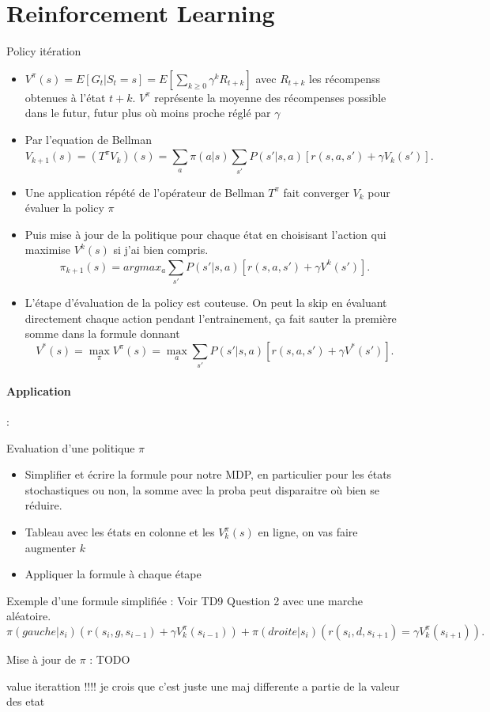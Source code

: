 \documentclass{article}
\theoremstyle{plain}%
\theoremstyle{definition}
\theoremstyle{remark}
\begin{document}
\section{Reinforcement Learning}
Policy itération \begin{itemize}
    \item $ V^\pi (s) = E[G_t | S_t = s] = E[ \sum_{k \geq 0}^{} \gamma ^k R_{t+k}] $ avec $ R_{t+k} $ les récompenss obtenues à l'état $ t+k $. $ V^\pi $ représente la moyenne des récompenses possible dans le futur, futur plus où moins proche réglé par $ \gamma  $ 
    \item Par l'equation de Bellman
    \[
        V_{k+1}(s) = (T^\pi V_k)(s) = \sum_{a}^{}\pi (a | s) \sum_{s'}^{}P(s' | s, a) [r(s, a, s') + \gamma V_k(s')]
    .\]
    \item Une application répété de l'opérateur de Bellman $ T^\pi  $ fait converger $ V_k $ pour évaluer la policy $ \pi  $ 
    \item Puis mise à jour de la politique pour chaque état en choisisant l'action qui maximise $ V^k(s) $ si j'ai bien compris. 
    \[
        \pi _{k+1}(s) = argmax_a \sum_{s'}^{} P(s' | s, a) [ r(s, a, s') + \gamma V^{k}(s')]
    .\]
    \item L'étape d'évaluation de la policy est couteuse. On peut la skip en évaluant directement chaque action pendant l'entrainement, ça fait sauter la première somme dans la formule donnant 
    \[
        V^*(s) = \max _\pi V^\pi (s) = \max _a \sum_{s'}^{} P(s' | s, a)[r(s, a, s') + \gamma V^*(s')]
    .\]
\end{itemize}


\paragraph*{Application} : 

Evaluation d'une politique $ \pi  $ 
\begin{itemize}
    \item Simplifier et écrire la formule pour notre MDP, en particulier pour les états stochastiques ou non, la somme avec la proba peut disparaitre où bien se réduire.
    \item Tableau avec les états en colonne et les $ V^\pi_k (s) $ en ligne, on vas faire augmenter $ k $ 
    \item Appliquer la formule à chaque étape
\end{itemize}
Exemple d'une formule simplifiée : Voir TD9 Question 2 avec une marche aléatoire. 
\[
    \pi (gauche | s_i) (r(s_i, g, s_{i-1}) + \gamma V_k^\pi (s_{i-1})) + \pi (droite | s_i) (r(s_i, d, s_{i+1}) = \gamma V_k^\pi (s_{i+1}))
.\]

Mise à jour de $ \pi $ : TODO

value iterattion !!!! je crois que c'est juste une maj differente a partie de la valeur des etat
\end{document}
